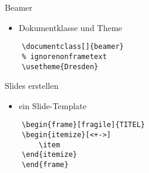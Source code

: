 \begin{frame}[fragile]{Beamer}
    \begin{itemize}[<+->]
        \item Dokumentklasse und Theme
    \end{itemize}
\begin{lstlisting}
    \documentclass[]{beamer}
    % ignorenonframetext
    \usetheme{Dresden}
\end{lstlisting}
\end{frame}

\begin{frame}[fragile]{Slides erstellen}
\begin{itemize}[<+->]
    \item ein Slide-Template
\end{itemize}
\begin{lstlisting}
    \begin{frame}[fragile]{TITEL}
    \begin{itemize}[<+->]
        \item 
    \end{itemize}
    \end{frame}
\end{lstlisting}
\end{frame}